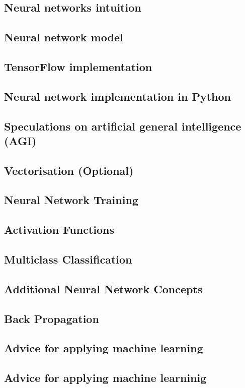 \subsection{Neural networks intuition}
\subsection{Neural network model}
\subsection{TensorFlow implementation}
\subsection{Neural network implementation in Python}
\subsection{Speculations on artificial general intelligence (AGI)}
\subsection{Vectorisation (Optional)}
\subsection{Neural Network Training}
\subsection{Activation Functions}
\subsection{Multiclass Classification}
\subsection{Additional Neural Network Concepts}
\subsection{Back Propagation}
\subsection{Advice for applying machine learning}
\subsection{Advice for applying machine learninig}

